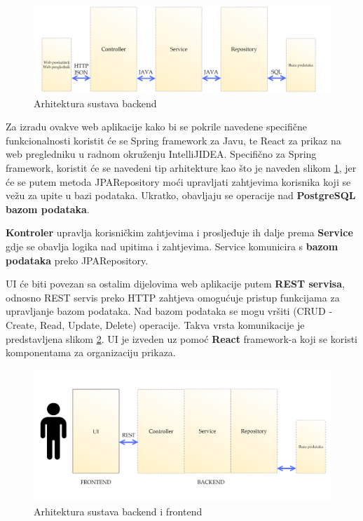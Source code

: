 \begin{figure}[H]
	\includegraphics[width=\textwidth]{slike/arhitekturaSustava2.png} %
	\centering
	\caption{Arhitektura sustava backend}
	\label{fig:arhitekturasustava2}
\end{figure}

\textnormal{Za izradu ovakve web aplikacije kako bi se pokrile navedene specifične funkcionalnosti koristit će se Spring framework za Javu, te React za prikaz na web pregledniku u radnom okruženju IntelliJIDEA.
	Specifično za Spring framework, koristit će se navedeni tip arhitekture kao što je naveden slikom \ref{fig:arhitekturasustava2}, jer će se putem metoda JPARepository moći upravljati zahtjevima korisnika koji se vežu za upite u bazi podataka.
	Ukratko, obavljaju se operacije nad \textbf{PostgreSQL bazom podataka}.}

\textnormal{\textbf{Kontroler} upravlja korisničkim zahtjevima i prosljeđuje ih dalje prema \textbf{Service} gdje se obavlja logika nad upitima i zahtjevima. Service komunicira s \textbf{bazom podataka} preko JPARepository.}

\textnormal{UI će biti povezan sa ostalim dijelovima web aplikacije putem \textbf{REST servisa}, odnosno REST servis preko HTTP zahtjeva omogućuje pristup funkcijama za upravljanje bazom podataka. Nad bazom podataka se mogu vršiti  (CRUD - Create, Read, Update, Delete) operacije. Takva vrsta komunikacije je predstavljena slikom \ref{fig:arhitekturasustava3}.
	UI je izveden uz pomoć \textbf{React} framework-a koji se koristi komponentama za organizaciju prikaza.}

\begin{figure}[H]
	\includegraphics[width=\textwidth]{slike/arhitekturaSustava3.png} %
	\centering
	\caption{Arhitektura sustava backend i frontend}
	\label{fig:arhitekturasustava3}
\end{figure}

